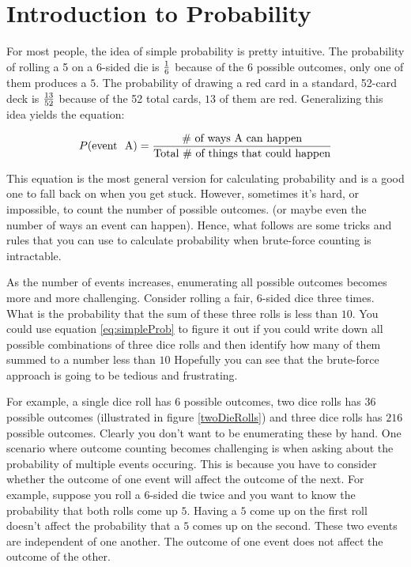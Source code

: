 \chapter{Introduction to Probability}
 \label{chap:probability} 

  For most people, the idea of simple
 probability is pretty intuitive.  The probability of rolling a 5 on a
 6-sided die is ${ 1\over 6}$ because of the $6$ possible outcomes,
 only one of them produces a $5$.  The probability of drawing a red
 card in a standard, 52-card deck is ${13\over 52}$ because of the 52
 total cards, $13$ of them are red.  Generalizing this idea yields the
 equation:

\begin{equation}\label{eq:simpleProb}
  P(\text{event~ A}) = {\text{\#~of~ways~A~can~happen}\over \text{Total~\#~of~things~that~could~happen}}
\end{equation}


This equation is the most general version for calculating probability
and is a good one to fall back on when you get stuck.  However,
sometimes it's hard, or impossible, to count the number of possible
outcomes. (or maybe even the number of ways an event can
happen). Hence, what follows are some tricks and rules that you can
use to calculate probability when brute-force counting is intractable.

 As the number of events
increases, enumerating all possible outcomes becomes more and more
challenging.  Consider rolling a fair, $6$-sided dice three times.
What is the probability that the sum of these three rolls is less than
$10$.  You could use equation \eqref{eq:simpleProb} to figure it out
if you could write down all possible combinations of three dice rolls
and then identify how many of them summed to a number less than $10$
Hopefully you can see that the brute-force approach is going to be
tedious and frustrating.

For example, a single dice roll has $6$ possible outcomes, two dice
rolls has $36$ possible outcomes (illustrated in figure
\ref{twoDieRolls}) and three dice rolls has $216$ possible outcomes.
Clearly you don't want to be enumerating these by hand.  One scenario
where outcome counting becomes challenging is when asking about the
probability of multiple events occuring.  This is because you have to
consider whether the outcome of one event will affect the outcome of
the next.  For example, suppose you roll a $6$-sided die twice and you
want to know the probability that both rolls come up $5$.  Having a
$5$ come up on the first roll doesn't affect the probability that a
$5$ comes up on the second.  These two events are independent of one
another.  The outcome of one event does not affect the outcome of the
other.

